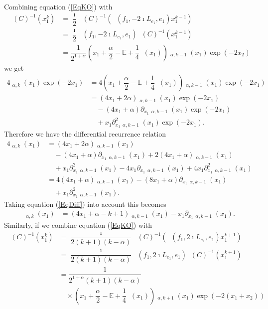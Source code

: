 \documentclass{amsart}
\numberwithin{theorem}{section}
\theoremstyle{definition}
\theoremstyle{remark}
\def\E{\mathds{E} }
\DeclareMathOperator{\bessel}{\mathcal B_\lambda}
\DeclareMathOperator{\KO}{\widetilde U}
\newcommand{\iSB}{\pil(C)^{-1}}
\newcommand{\pt}[1]{\partial_{#1}}
\DeclareMathOperator{\pil}{\pi_\lambda}
\DeclareMathOperator{\rol}{\rho_\lambda}
\begin{document}
Combining equation (\ref{EqKO}) with
\begin{align*}
\iSB(x_1^k) &= \dfrac{\imath}{2}\iSB(\rol(f_1,-2\imath L_{e_1}, e_1)x_1^{k-1}) \\
&=  \dfrac{\imath}{2}\pil(f_1,-2\imath L_{e_1}, e_1)\iSB(x_1^{k-1})\\
&= \dfrac{1}{2^{1+\alpha}}\left(x_1+\dfrac{\alpha}{2}-\E+\dfrac{1}{4}\bessel(x_1)\right)\KO_{\alpha, k-1}(x_1)\exp(-2x_2)
\end{align*}
we get
\begin{align*}
4\KO_{\alpha, k}(x_1)\exp(-2x_1) &= 4\left(x_1+\dfrac{\alpha}{2}-\E+\dfrac{1}{4}\bessel(x_1)\right)\KO_{\alpha, k-1}(x_1)\exp(-2x_1)\\
&= \left(4x_1+2\alpha\right)\KO_{\alpha, k-1}(x_1)\exp(-2x_1)\\ 
&\quad - \left(4x_1+\alpha\right)\pt {x_1}\KO_{\alpha, k-1}(x_1)\exp(-2x_1)\\
&\quad + x_1 \pt {x_1}^2 \KO_{\alpha, k-1}(x_1)\exp(-2x_1).
\end{align*}
Therefore we have the differential recurrence relation
\begin{align*}
4\KO_{\alpha, k}(x_1) &= \left(4x_1+2\alpha\right)\KO_{\alpha, k-1}(x_1)\\ 
&\quad - \left(4x_1+\alpha\right)\pt {x_1}\KO_{\alpha, k-1}(x_1) + 2\left(4x_1+\alpha\right)\KO_{\alpha, k-1}(x_1)\\
&\quad + x_1 \pt {x_1}^2\KO_{\alpha, k-1}(x_1) - 4 x_1 \pt {x_1} \KO_{\alpha, k-1}(x_1) + 4 x_1 \pt {x_1}^2 \KO_{\alpha, k-1}(x_1)\\
&= 4\left(4x_1+\alpha\right)\KO_{\alpha, k-1}(x_1) - \left(8x_1+\alpha\right)\pt {x_1}\KO_{\alpha, k-1}(x_1)\\
&\quad + x_1 \pt {x_1}^2\KO_{\alpha, k-1}(x_1).
\end{align*}
Taking equation (\ref{EqDiff}) into account this becomes
\begin{align}\label{Diffrec1}
\KO_{\alpha, k}(x_1) &= \left(4x_1 + \alpha - k + 1\right)\KO_{\alpha, k-1}(x_1) - x_1\pt {x_1}\KO_{\alpha, k-1}(x_1).
\end{align}
Similarly, if we combine equation (\ref{EqKO}) with
\begin{align*}
\iSB(x_1^k) &= \dfrac{\imath}{2(k+1)(k-\alpha)}\iSB(\rol(f_1,2\imath L_{e_1}, e_1)x_1^{k+1}) \\
&=  \dfrac{\imath}{2(k+1)(k-\alpha)}\pil(f_1,2\imath L_{e_1}, e_1)\iSB(x_1^{k+1})\\
&= \dfrac{1}{2^{1+\alpha}(k+1)(k-\alpha)}\\
&\quad \times\left(x_1+\dfrac{\alpha}{2}-\E+\dfrac{1}{4}\bessel(x_1)\right)\KO_{\alpha, k+1}(x_1)\exp(-2(x_1+x_2))
\end{align*}
\end{document}
